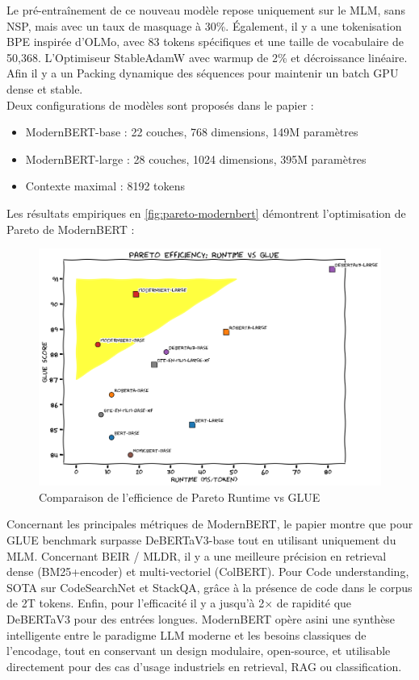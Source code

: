 Le pré-entraînement de ce nouveau modèle repose uniquement sur le MLM, sans NSP, mais avec un taux de masquage à 30\%. Également, il y a une tokenisation BPE inspirée d'OLMo, avec 83 tokens spécifiques et une taille de vocabulaire de 50,368. L'Optimiseur StableAdamW avec warmup de 2\% et décroissance linéaire. Afin il y a un Packing dynamique des séquences pour maintenir un batch GPU dense et stable.\\

Deux configurations de modèles sont proposés dans le papier :
\begin{itemize}
    \item ModernBERT-base : 22 couches, 768 dimensions, 149M param\`etres
    \item ModernBERT-large : 28 couches, 1024 dimensions, 395M param\`etres
    \item Contexte maximal : 8192 tokens
\end{itemize}

\newpage

Les résultats empiriques en \autoref{fig:pareto-modernbert} démontrent l'optimisation de Pareto de ModernBERT : 

\begin{figure}[H]
    \centering
    \includegraphics[width=0.9\linewidth]{images/modernbert_pareto_curve.png}
    \caption{Comparaison de l'efficience de Pareto Runtime vs GLUE}
    \label{fig:pareto-modernbert}
\end{figure}

Concernant les principales métriques de ModernBERT, le papier montre que pour GLUE benchmark surpasse DeBERTaV3-base tout en utilisant uniquement du MLM. Concernant BEIR / MLDR, il y a une meilleure précision en retrieval dense (BM25+encoder) et multi-vectoriel (ColBERT). Pour Code understanding, SOTA sur CodeSearchNet et StackQA, grâce à la présence de code dans le corpus de 2T tokens. Enfin, pour l'efficacité il y a jusqu'à 2$\times$ de rapidité que DeBERTaV3 pour des entrées longues. ModernBERT op\`ere asini une synth\`ese intelligente entre le paradigme LLM moderne et les besoins classiques de l'encodage, tout en conservant un design modulaire, open-source, et utilisable directement pour des cas d'usage industriels en retrieval, RAG ou classification.\\

